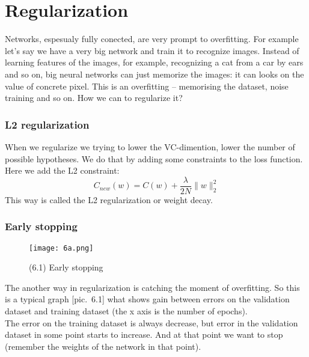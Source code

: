 \section{Regularization}

Networks, espesualy fully conected, are very prompt to overfitting. For example let's say we have a very big network and train it to recognize images. Instead of learning features of the images, for example, recognizing a cat from a car by ears and so on, big neural networks can just memorize the images: it can looks on the value of concrete pixel. This is an overfitting -- memorising the dataset,  noise training and so on. How we can to regularize it? 

\subsubsection*{L2 regularization}

When we regularize we trying to lower the VC-dimention, lower the number of possible hypotheses. We do that by adding some constraints to the loss function. Here we add the L2 constraint:
$$C_{new}(w)=C(w)+\frac{\lambda}{2N}\|w\|_2^2$$
This way is called the L2 regularization or weight decay.\\
{\it <Some intuition why it works>} %

\subsubsection*{Early stopping}

\begin{wrapfigure}{r}{0.4\linewidth}
  \vspace{-1.3cm}
  \begin{center}
    \texttt{[image: 6a.png]}
  \end{center}
  \vspace{-0.3cm}
  \caption*{(6.1) Early stopping}
  \vspace{-1.5cm}
\end{wrapfigure}
The another way in regularization is catching the moment of overfitting. So this is a typical graph [pic.~6.1] what shows gain between errors on the validation dataset and training dataset (the x axis is the number of epochs).\\
The error on the training dataset is always decrease, but error in the validation dataset in some point starts to increase. And at that point we want to stop (remember the weights of the network in that point).


